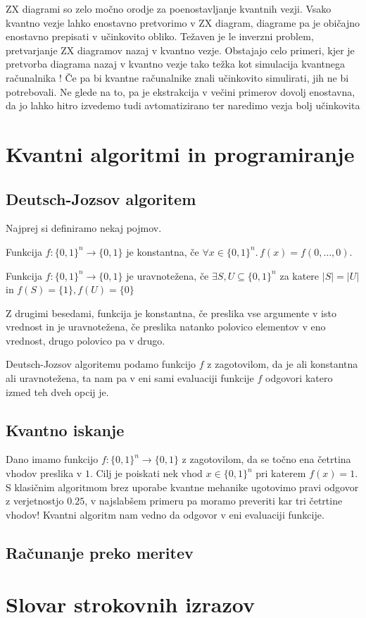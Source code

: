 \documentclass[mat1]{fmfdelo}
\newcommand{\sep}{\ensuremath{.\,}}
\begin{document}
ZX diagrami so zelo močno orodje za poenostavljanje kvantnih vezji. Vsako kvantno vezje lahko enostavno pretvorimo v ZX diagram, diagrame pa je običajno enostavno prepisati v učinkovito obliko. Težaven je le inverzni problem, pretvarjanje ZX diagramov nazaj v kvantno vezje. Obstajajo celo primeri, kjer je pretvorba diagrama nazaj v kvantno vezje tako težka kot simulacija kvantnega računalnika \cite{Niel}! Če pa bi kvantne računalnike znali učinkovito simulirati, jih ne bi potrebovali. Ne glede na to, pa je ekstrakcija v večini primerov dovolj enostavna, da jo lahko hitro izvedemo tudi avtomatizirano ter naredimo vezja bolj učinkovita
\section{Kvantni algoritmi in programiranje}
\subsection{Deutsch-Jozsov algoritem}
Najprej si definiramo nekaj pojmov.
\begin{definicija} Funkcija \(f:\{0,1\}^n\to \{0,1\}\) je konstantna, če \(\forall x\in\{0,1\}^n\sep f(x) = f(0,\ldots, 0)\).\end{definicija}
\begin{definicija}
    Funkcija \(f: \{0,1\}^n \to \{0,1\}\) je uravnotežena, če \(\exists S, U\subseteq \{0,1\}^n\) za katere \(\lvert S\rvert = \lvert U\rvert\) in \(f(S) = \{1\}, f(U) = \{0\}\)
\end{definicija}
Z drugimi besedami, funkcija je konstantna, če preslika vse argumente v isto vrednost in je uravnotežena, če preslika natanko polovico elementov v eno vrednost, drugo polovico pa v drugo.

Deutsch-Jozsov algoritemu podamo funkcijo \(f\) z zagotovilom, da je ali konstantna ali uravnotežena, ta nam pa v eni sami evaluaciji funkcije \(f\) odgovori katero izmed teh dveh opcij je.
\subsection{Kvantno iskanje}
Dano imamo funkcijo \(f: \{0,1\}^n\to \{0,1\}\) z zagotovilom, da se točno ena četrtina vhodov preslika v \(1\). Cilj je poiskati nek vhod \(x\in\{0,1\}^n\) pri katerem \(f(x) = 1\). S klasičnim algoritmom brez uporabe kvantne mehanike ugotovimo pravi odgovor z verjetnostjo \(0.25\), v najslabšem primeru pa moramo preveriti kar tri četrtine vhodov! Kvantni algoritm nam vedno da odgovor v eni evaluaciji funkcije.
\subsection{Računanje preko meritev}


\section*{Slovar strokovnih izrazov}



\printbibliography
\end{document}

